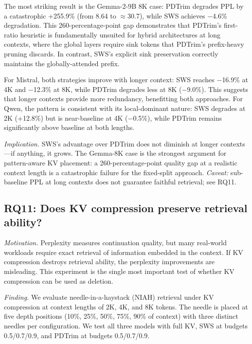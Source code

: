 \documentclass[11pt]{article}
\newcommand{\method}{SWS}
\newcommand{\sws}{SWS}
\newcommand{\pct}{\%}
\theoremstyle{definition}
\theoremstyle{plain}
\begin{document}
The most striking result is the Gemma-2-9B 8K case: PDTrim degrades PPL by a catastrophic +255.9\pct{} (from 8.64 to $\approx$30.7), while \sws{} achieves $-$4.6\pct{} degradation.  This 260-percentage-point gap demonstrates that PDTrim's first-ratio heuristic is fundamentally unsuited for hybrid architectures at long contexts, where the global layers require sink tokens that PDTrim's prefix-heavy pruning discards.  In contrast, \sws{}'s explicit sink preservation correctly maintains the globally-attended prefix.

For Mistral, both strategies improve with longer context: \sws{} reaches $-$16.9\pct{} at 4K and $-$12.3\pct{} at 8K, while PDTrim degrades less at 8K ($-$9.0\pct{}).  This suggests that longer contexts provide more redundancy, benefitting both approaches.  For Qwen, the pattern is consistent with its local-dominant nature: \sws{} degrades at 2K (+12.8\pct{}) but is near-baseline at 4K ($-$0.5\pct{}), while PDTrim remains significantly above baseline at both lengths.

\emph{Implication.}  \method{}'s advantage over PDTrim does not diminish at longer contexts---if anything, it grows.  The Gemma-8K case is the strongest argument for pattern-aware KV placement: a 260-percentage-point quality gap at a realistic context length is a catastrophic failure for the fixed-split approach.  \emph{Caveat:} sub-baseline PPL at long contexts does not guarantee faithful retrieval; see RQ11.

\subsection{RQ11: Does KV compression preserve retrieval ability?}
\label{sec:rq11}

\emph{Motivation.}  Perplexity measures continuation quality, but many real-world workloads require exact retrieval of information embedded in the context.  If KV compression destroys retrieval ability, the perplexity improvements are misleading.  This experiment is the single most important test of whether KV compression can be used as deletion.

\emph{Finding.}  We evaluate needle-in-a-haystack (NIAH) retrieval under KV compression at context lengths of 2K, 4K, and 8K tokens.  The needle is placed at five depth positions (10\%, 25\%, 50\%, 75\%, 90\% of context) with three distinct needles per configuration.  We test all three models with full KV, \sws{} at budgets 0.5/0.7/0.9, and PDTrim at budgets 0.5/0.7/0.9.
\end{document}
